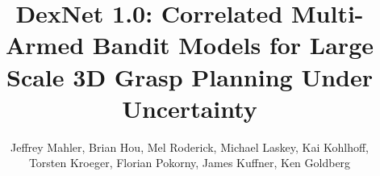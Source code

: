\documentclass[letterpaper, 10 pt, conference]{ieeeconf}  %
\begin{document}
\title{\LARGE \bf DexNet 1.0: Correlated Multi-Armed Bandit Models for Large Scale 3D Grasp Planning Under Uncertainty}
\author{Jeffrey Mahler, Brian Hou, Mel Roderick, Michael Laskey, Kai Kohlhoff, \\ Torsten Kroeger, Florian Pokorny, James Kuffner, Ken Goldberg}
\maketitle

%
%


%
%
%
%
%
%
%

%




\end{document}
